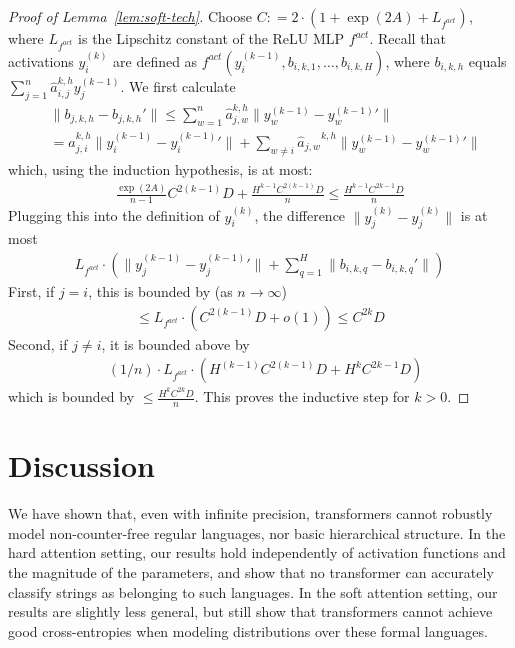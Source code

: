 \documentclass[11pt,a4paper]{article}
\begin{document}
\begin{proof}[Proof of Lemma~\ref{lem:soft-tech}]
Choose $C : = 2\cdot (1 + \exp(2A) + L_{f^{act}})$, where $L_{f^{act}}$ is the Lipschitz constant of the ReLU MLP $f^{act}$. 
Recall that activations $y_i^{(k)}$ are defined as $f^{act}(y_i^{(k-1)}, b_{i,k,1}, \dots, b_{i,k,H})$, where $b_{i,k,h}$ equals $\sum_{j=1}^n \hat{a}_{i,j}^{k,h} y_j^{(k-1)}$.
We first calculate
\begin{align*}
& \|b_{j,k,h} - b_{j,k,h}'\|  \leq \sum_{w=1}^n \hat{a}_{j,w}^{k,h} \|y_w^{(k-1)} - {{y}_w^{(k-1)}}'\|
\\
& = \hat{a}_{j,i}^{k,h} \|y_i^{(k-1)} - {{y}_i^{(k-1)}}'\|  + \sum_{w \neq i} {\hat{a}_{j,w}}^{k,h} \|y_w^{(k-1)} - {{y}_w^{(k-1)}}'\|
\end{align*}
which, using the induction hypothesis, is at most:
\begin{align*}
\frac{\exp(2A)}{n-1}  C^{2(k-1)} D + \frac{H^{k-1}C^{2(k-1)}D}{n} \leq \frac{H^{k-1} C^{2k-1} D}{n}
\end{align*}
Plugging this into the definition of $y_i^{(k)}$, the difference $\|y_j^{(k)} - {y_j^{(k)}}\|$ is at most
\begin{align*}
	L_{f^{act}} \cdot \left(\|y_j^{(k-1)}-{y_j^{(k-1)}}'\| + \sum_{q=1}^H \|b_{i,k,q} - b_{i,k,q}'\|\right)
\end{align*}
First, if $j= i$, this is bounded by (as $n \rightarrow \infty$)
\begin{align*}
\leq L_{f^{act}} \cdot \left(C^{2(k-1)}D + o(1)\right) \leq C^{2k}D
\end{align*}
Second, if $j\neq i$, it is bounded above by
\begin{align*}
	&  (1/n) \cdot L_{f^{act}} \cdot \left(H^{(k-1)} C^{2(k-1)}D + H^{k} C^{2k-1} D\right)
\end{align*} 
which is bounded by $\leq  \frac{H^{k} C^{2k} D}{n}$.
This proves the inductive step for $k>0$.
\end{proof}




\section{Discussion}\label{sec:discussion}

We have shown that, even with infinite precision, transformers cannot robustly model non-counter-free regular languages, nor basic hierarchical structure.
In the hard attention setting, our results hold independently of activation functions and the magnitude of the parameters, and show that no transformer   can accurately classify strings as belonging to such languages.
In the soft attention setting, our results are slightly less general, but still show that transformers cannot achieve good cross-entropies when modeling distributions over these formal languages.
\end{document}
